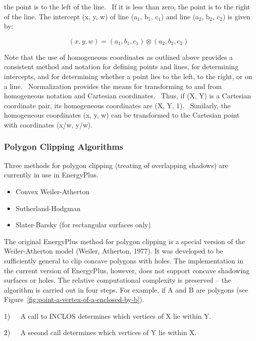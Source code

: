 the point is to the left of the line.~ If it is less than zero, the point is to the right of the line. The intercept (x, y, w) of line (a\(_{1}\), b\(_{1}\), c\(_{1}\)) and line (a\(_{2}\), b\(_{2}\), c\(_{2}\)) is given by:

\begin{equation}
(x,y,w) = ({a_1},{b_1},{c_1}) \otimes ({a_2},{b_2},{c_2})
\end{equation}

Note that the use of homogeneous coordinates as outlined above provides a consistent method and notation for defining points and lines, for determining intercepts, and for determining whether a point lies to the left, to the right, or on a line.~ Normalization provides the means for transforming to and from homogeneous notation and Cartesian coordinates.~ Thus, if (X, Y) is a Cartesian coordinate pair, its homogeneous coordinates are (X, Y, 1).~ Similarly, the homogeneous coordinates (x, y, w) can be transformed to the Cartesian point with coordinates (x/w, y/w).

\subsubsection{Polygon Clipping Algorithms}\label{polygon-clipping-algorithms}

Three methods for polygon clipping (treating of overlapping shadows) are currently in use in EnergyPlus.

\begin{itemize}
\item
  Convex Weiler-Atherton
\item
  Sutherland-Hodgman
\item
  Slater-Barsky (for rectangular surfaces only)
\end{itemize}

The original EnergyPlus method for polygon clipping is a special version of the Weiler-Atherton model (Weiler, Atherton, 1977). It was developed to be sufficiently general to clip concave polygons with holes. The implementation in the current version of EnergyPlus, however, does not support concave shadowing surfaces or holes. The relative computational complexity is preserved -- the algorithm is carried out in four steps. For example, if A and B are polygons (see Figure~\ref{fig:point-a-vertex-of-a-enclosed-by-b}).

1)~~~A call to INCLOS determines which vertices of X lie within Y.

2)~~~A second call determines which vertices of Y lie within X.

